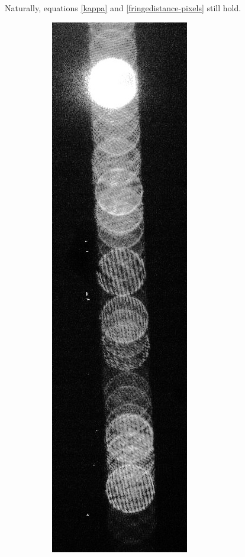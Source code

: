 \documentclass[11.5pt,oneside]{book}
\begin{document}
Naturally, equations \eqref{kappa} and \eqref{fringedistance-pixels} still hold.
\begin{figure}[h!]
    \centering
    \begin{subfigure}[b]{0.4\textwidth}
        \centering
        \includegraphics[height=0.6\textheight]{img/dots_cropped.jpg}
        \caption{}
    \end{subfigure}
    \begin{subfigure}[b]{0.4\textwidth}
        \centering

\end{subfigure}
\end{figure}
\end{document}
